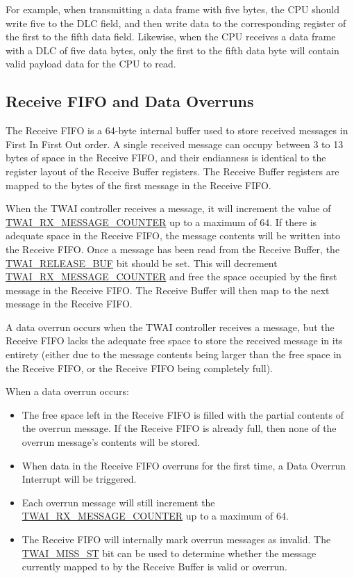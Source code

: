 \documentclass[main\_\_EN.tex]{subfiles}
\begin{document}
For example, when transmitting a data frame with five bytes, the CPU should write five to the DLC field, and then write data to the corresponding register of the first to the fifth data field. Likewise, when the CPU receives a data frame with a DLC of five data bytes, only the first to the fifth data byte will contain valid payload data for the CPU to read.

\subsection{Receive FIFO and Data Overruns}

The Receive FIFO is a 64-byte internal buffer used to store received messages in First In First Out order. A single received message can occupy between 3 to 13 bytes of space in the Receive FIFO, and their endianness is identical to the register layout of the Receive Buffer registers. The Receive Buffer registers are mapped to the bytes of the first message in the Receive FIFO.

When the TWAI controller receives a message, it will increment the value of \hyperref[fielddesc:TWAIRXMESSAGECOUNTER]{TWAI\_RX\_MESSAGE\_COUNTER} up to a maximum of 64. If there is adequate space in the Receive FIFO, the message contents will be written into the Receive FIFO. Once a message has been read from the Receive Buffer, the \hyperref[fielddesc:TWAIRELEASEBUF]{TWAI\_RELEASE\_BUF} bit should be set. This will decrement \hyperref[fielddesc:TWAIRXMESSAGECOUNTER]{TWAI\_RX\_MESSAGE\_COUNTER} and free the space occupied by the first message in the Receive FIFO. The Receive Buffer will then map to the next message in the Receive FIFO.

A data overrun occurs when the TWAI controller receives a message, but the Receive FIFO lacks the adequate free space to store the received message in its entirety (either due to the message contents being larger than the free space in the Receive FIFO, or the Receive FIFO being completely full). 

When a data overrun occurs:
\begin{itemize}
    \item The free space left in the Receive FIFO is filled with the partial contents of the overrun message. If the Receive FIFO is already full, then none of the overrun message's contents will be stored.
    \item When data in the Receive FIFO overruns for the first time, a Data Overrun Interrupt will be triggered.
    \item Each overrun message will still increment the  \hyperref[fielddesc:TWAIRXMESSAGECOUNTER]{TWAI\_RX\_MESSAGE\_COUNTER} up to a maximum of 64.
    \item The Receive FIFO will internally mark overrun messages as invalid. The \hyperref[fielddesc:TWAIMISSST]{TWAI\_MISS\_ST} bit can be used to determine whether the message currently mapped to by the Receive Buffer is valid or overrun.
\end{itemize}
\end{document}
